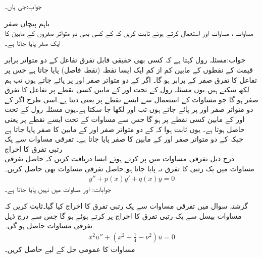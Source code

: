 جواب:جی ہاں۔

\quad باہم پیچاں صفر\\
مساوات ، مساوات  اور  استعمال کرتے ہوئے ثابت کریں کہ  کے کسی بھی دو متواتر صفروں کے مابین  کا ایک صفر پایا جاتا ہے۔ 

جواب:مسئلہ رول کہتا ہے کہ کسی بھی حقیقی قابل تفرق تفاعل کے دو متواتر برابر قیمت کے نقطوں کے مابین کم از کم ایک ایسا نقطہ (نقطہ فاصل) پایا جاتا ہے جس پر تفاعل کا تفرق صفر کے برابر ہو گا۔ اگر  کے دو متواتر صفر  اور  پر پائے جاتے ہوں تب ہم  لکھ سکتے ہیں۔یوں مسئلہ رول کے تحت  اور  کے مابین کسی نقطے پر تفاعل  کا تفرق صفر  ہو گا جو مساوات  کے استعمال سے ایسے نقطے پر  یعنی  دیتا ہے۔اسی طرح اگر  کے دو متواتر صفر  اور  پر پائے جاتے ہوں تب  اور  لکھا جا سکتا ہے۔یوں مسئلہ رول کے تحت  اور  کے مابین کسی نقطے پر  ہو گا جس سے مساوات  کے تحت ایسے نقطے پر  یعنی  حاصل ہوتا ہے۔ یوں  ثابت ہوا کہ  کے دو متواتر صفر  اور  کے مابین  کا صفر پایا جاتا ہے جبکہ  کے دو متواتر صفر  اور  کے مابین  کا صفر پایا جاتا ہے۔
\quad تفرقی مساوات سے یک رتبی تفرق کا اخراج\\
 درج ذیل تفرقی مساوات میں  پر کرتے ہوئے ایسا  دریافت کریں کہ حاصل تفرقی مساوات میں یک رتبی کا تفرق نہ پایا جاتا ہو۔حاصل تفرقی مساوات بھی حاصل کریں۔
\begin{align*}
y''+p(x)y'+q(x)y=0
\end{align*}
جوابات: اور مساوات  میں  نہیں پایا جاتا ہے۔

گزشتہ سوال میں تفرقی مساوات سے یک رتبی تفرق کا اخراج کیا گیا۔ثابت کریں کہ مساوات بیسل  سے یک رتبی تفرق کا اخراج  پر کرتے ہوئے ہو گا جس سے درج ذیل تفرقی مساوات حاصل ہو گی۔
\begin{align}\label{مساوات_بیسل_سادہ_صورت}
x^2u''+(x^2+\tfrac{1}{4}-\nu^2)u=0
\end{align}
مساوات  کا عمومی حل  کے لیے حاصل کریں۔

